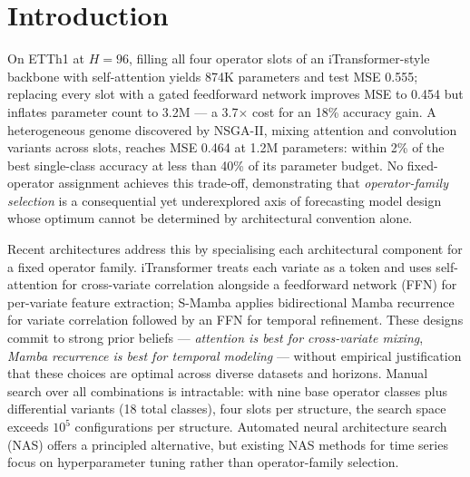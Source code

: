 \section{Introduction}
\label{sec:intro}

On ETTh1 at $H\!=\!96$, filling all four operator slots of an iTransformer-style backbone with self-attention yields 874K parameters and test MSE 0.555; replacing every slot with a gated feedforward network improves MSE to 0.454 but inflates parameter count to 3.2M — a 3.7$\times$ cost for an 18\% accuracy gain.
A heterogeneous genome discovered by NSGA-II, mixing attention and convolution variants across slots, reaches MSE 0.464 at 1.2M parameters: within 2\% of the best single-class accuracy at less than 40\% of its parameter budget.
No fixed-operator assignment achieves this trade-off, demonstrating that \emph{operator-family selection} is a consequential yet underexplored axis of forecasting model design whose optimum cannot be determined by architectural convention alone.

Recent architectures address this by specialising each architectural component for a fixed operator family.
iTransformer \cite{liu2024itransformer} treats each variate as a token and uses self-attention for cross-variate correlation alongside a feedforward network (FFN) for per-variate feature extraction;
S-Mamba \cite{wang2024smamba} applies bidirectional Mamba recurrence for variate correlation followed by an FFN for temporal refinement.
These designs commit to strong prior beliefs — \emph{attention is best for cross-variate mixing}, \emph{Mamba recurrence is best for temporal modeling} — without empirical justification that these choices are optimal across diverse datasets and horizons.
Manual search over all combinations is intractable: with nine base operator classes plus differential variants (18 total classes), four slots per structure, the search space exceeds $10^{5}$ configurations per structure.
Automated neural architecture search (NAS) \cite{elsken2019neural,zoph2017neural} offers a principled alternative, but existing NAS methods for time series focus on hyperparameter tuning rather than operator-family selection.

